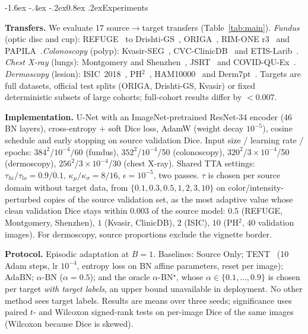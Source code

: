 \documentclass{article}
\makeatletter
\renewcommand\section{\@startsection{section}{1}{\z@}%
  {-1.6ex \@plus -.4ex \@minus -.2ex}{0.8ex \@plus .2ex}{\normalfont}}
\makeatother
\begin{document}
\section{Experiments}
\label{sec:exp}

\textbf{Transfers.} We evaluate 17 source$\to$target transfers (Table~\ref{tab:main}). \emph{Fundus} (optic disc and cup): REFUGE~\cite{orlando2020refuge} to
Drishti-GS~\cite{sivaswamy2014drishti}, ORIGA~\cite{zhang2010origa}, RIM-ONE r3~\cite{fumero2011rimone} and PAPILA~\cite{kovalyk2022papila}.\emph{Colonoscopy} (polyp): Kvasir-SEG~\cite{jha2020kvasir}, CVC-ClinicDB~\cite{bernal2015clinicdb} and ETIS-Larib~\cite{silva2014etis}. \emph{Chest X-ray} (lungs): Montgomery and Shenzhen~\cite{jaeger2014cxr}, JSRT~\cite{shiraishi2000jsrt} and COVID-QU-Ex~\cite{tahir2021covidquex}. \emph{Dermoscopy} (lesion): ISIC~2018~\cite{codella2019isic}, PH$^2$~\cite{mendonca2013ph2}, HAM10000~\cite{tschandl2018ham} and Derm7pt~\cite{kawahara2019derm7pt}. Targets are full datasets, official test splits (ORIGA, Drishti-GS, Kvasir) or fixed deterministic subsets of large cohorts; full-cohort results differ by $<0.007$.

\textbf{Implementation.} U-Net with an ImageNet-pretrained ResNet-34 encoder (46 BN layers), cross-entropy + soft Dice loss, AdamW (weight decay $10^{-5}$), cosine
schedule and early stopping on source validation Dice. Input size / learning rate / epochs: $384^2$/$10^{-4}$/60 (fundus), $352^2$/$10^{-4}$/50 (colonoscopy), $320^2$/$3{\times}10^{-4}$/50 (dermoscopy), $256^2$/$3{\times}10^{-4}$/30 (chest X-ray). Shared TTA settings: $\tau_{hi}/\tau_{lo}=0.9/0.1$, $\kappa_\mu/\kappa_\sigma=8/16$, $\epsilon=10^{-5}$, two passes. $\tau$ is chosen per source domain without target data, from $\{0.1,0.3,0.5,1,2,3,10\}$ on color/intensity-perturbed copies of the source validation set, as the most adaptive value whose clean validation Dice stays within $0.003$ of the source model: $0.5$ (REFUGE, Montgomery, Shenzhen), $1$ (Kvasir, ClinicDB), $2$ (ISIC), $10$ (PH$^2$, 40 validation images). For dermoscopy, source proportions exclude the vignette
border.

\textbf{Protocol.} Episodic adaptation at $B{=}1$. Baselines: Source Only; TENT~\cite{wang2021tent} (10 Adam steps, lr $10^{-4}$, entropy loss on BN affine parameters, reset per image); AdaBN; $\alpha$-BN ($\alpha=0.5$); and the oracle $\alpha$-BN$^\star$, whose $\alpha\in\{0.1,\dots,0.9\}$ is chosen per target \emph{with target labels}, an upper bound unavailable in deployment. No other method sees target labels. Results are means over three seeds; significance uses paired $t$- and Wilcoxon signed-rank tests on per-image Dice of the same images (Wilcoxon because Dice is skewed).
\end{document}
